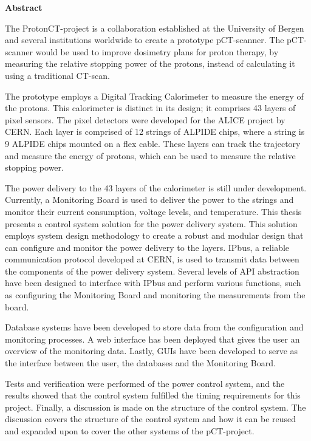 \documentclass[main.tex]{subfiles}
\begin{document}
\normalsize
 \vspace*{40pt}
 \begin{center}

\textbf{Abstract}\\ 

\hspace{10pt}

\end{center}
\normalsize
The ProtonCT-project is a collaboration established at the University of Bergen and several institutions worldwide to create a prototype pCT-scanner. The pCT-scanner would be used to improve dosimetry plans for proton therapy, by measuring the relative stopping power of the protons, instead of calculating it using a traditional CT-scan.

The prototype employs a Digital Tracking Calorimeter to measure the energy of the protons. This calorimeter is distinct in its design; it comprises 43 layers of pixel sensors. The pixel detectors were developed for the ALICE project by CERN. Each layer is comprised of 12 strings of ALPIDE chips, where a string is 9 ALPIDE chips mounted on a flex cable. These layers can track the trajectory and measure the energy of protons, which can be used to measure the relative stopping power. 

The power delivery to the 43 layers of the calorimeter is still under development. Currently, a Monitoring Board is used to deliver the power to the strings and monitor their current consumption, voltage levels, and temperature. This thesis presents a control system solution for the power delivery system. This solution employs system design methodology to create a robust and modular design that can configure and monitor the power delivery to the layers. IPbus, a reliable communication protocol developed at CERN, is used to transmit data between the components of the power delivery system. Several levels of API abstraction have been designed to interface with IPbus and perform various functions, such as configuring the Monitoring Board and monitoring the measurements from the board.

Database systems have been developed to store data from the configuration and monitoring processes. A web interface has been deployed that gives the user an overview of the monitoring data. Lastly, GUIs have been developed to serve as the interface between the user, the databases and the Monitoring Board.

Tests and verification were performed of the power control system, and the results showed that the control system fulfilled the timing requirements for this project. Finally, a discussion is made on the structure of the control system. The discussion covers the structure of the control system and how it can be reused and expanded upon to cover the other systems of the pCT-project.
\end{document}

